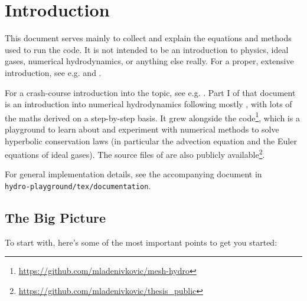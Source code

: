 \section{Introduction}


This document serves mainly to collect and explain the equations and methods
used to run the \hydro code. It is not intended to be an introduction to
physics, ideal gases, numerical hydrodynamics, or anything else really. For a
proper, extensive introduction, see e.g. \citet{toro} and \citet{leveque_2002}.

For a crash-course introduction into the topic, see e.g. \citet{gearrt}. Part I
of that document is an introduction into numerical hydrodynamics following
mostly \citet{toro}, with lots of the maths derived on a step-by-step basis. It
grew alongside the 
code\footnote{\url{https://github.com/mladenivkovic/mesh-hydro}}, which is a
playground to learn about and experiment with numerical methods to solve
hyperbolic conservation laws (in particular the advection equation and the Euler
equations of ideal gases). The source files of \citet{gearrt} are also
publicly
available\footnote{\url{https://github.com/mladenivkovic/thesis_public}}.

For general implementation details, see the accompanying document in \\
\texttt{hydro-playground/tex/documentation}.



\subsection{The Big Picture}

To start with, here's some of the most important points to get you started:

